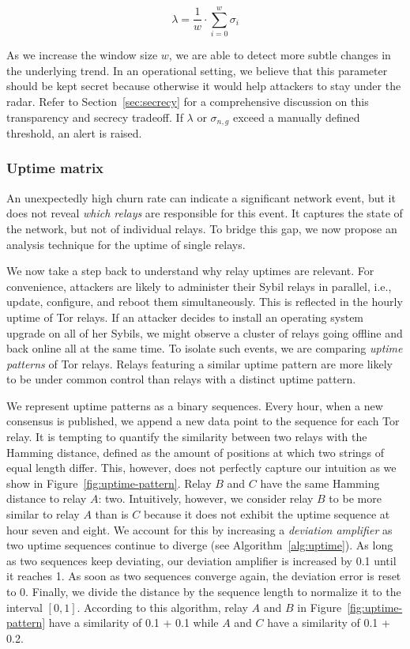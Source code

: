 \begin{equation}
\lambda = \frac{1}{w} \cdot \sum_{i=0}^{w} \sigma_{i}
\end{equation}

As we increase the window size $w$, we are able to detect more subtle changes in
the underlying trend.  In an operational setting, we believe that this parameter
should be kept secret because otherwise it would help attackers to stay under
the radar.  Refer to Section~\ref{sec:secrecy} for a comprehensive discussion on
this transparency and secrecy tradeoff.  If $\lambda$ or $\sigma_{n,g}$ exceed a
manually defined threshold, an alert is raised.


\subsubsection{Uptime matrix}
\label{sec:uptime-matrix}
An unexpectedly high churn rate can indicate a significant network event, but it
does not reveal \emph{which relays} are responsible for this event.  It captures
the state of the network, but not of individual relays.  To bridge this gap, we
now propose an analysis technique for the uptime of single relays.

We now take a step back to understand why relay uptimes are relevant.  For
convenience, attackers are likely to administer their Sybil relays in parallel,
i.e., update, configure, and reboot them simultaneously.  This is reflected in
the hourly uptime of Tor relays.  If an attacker decides to install an operating
system upgrade on all of her Sybils, we might observe a cluster of relays going
offline and back online all at the same time.  To isolate such events, we are
comparing \emph{uptime patterns} of Tor relays.  Relays featuring a similar
uptime pattern are more likely to be under common control than relays with a
distinct uptime pattern.

We represent uptime patterns as a binary sequences.  Every hour, when a new
consensus is published, we append a new data point to the sequence for each Tor
relay.  It is tempting to quantify the similarity between two relays with the
Hamming distance, defined as the amount of positions
at which two strings of equal length differ.  This, however, does not perfectly
capture our intuition as we show in Figure~\ref{fig:uptime-pattern}.  Relay $B$
and $C$ have the same Hamming distance to relay $A$: two.  Intuitively, however,
we consider relay $B$ to be more similar to relay $A$ than is $C$ because it
does not exhibit the uptime sequence at hour seven and eight.  We account for
this by increasing a \emph{deviation amplifier} as two uptime sequences
continue to diverge (see Algorithm~\ref{alg:uptime}).  As long as two sequences
keep deviating, our deviation amplifier is increased by 0.1 until it reaches 1.
As soon as two sequences converge again, the deviation error is reset to 0.
Finally, we divide the distance by the sequence length to normalize it to the
interval $[0, 1]$.  According to this algorithm, relay $A$ and $B$ in
Figure~\ref{fig:uptime-pattern} have a similarity of 0.1 + 0.1 while $A$ and $C$
have a similarity of 0.1 + 0.2.

